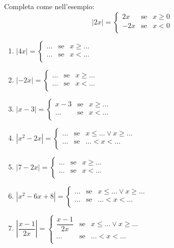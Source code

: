 \begin{esercizio}\label{ese:03.1}
Completa come nell'esempio:
\[
|2x|=
        \left\lbrace 
        \begin{array}{lcl}
        2x & \text{se}& x\geq 0\\
        -2x & \text{se}& x< 0\\
        \end{array}
        \right.
\]

\begin{enumerate}
\item 
\(
|4x|=
\left\lbrace 
\begin{array}{lcl}
\dots & \text{se}& x\geq\dots\\
\dots & \text{se}& x<\dots\\
\end{array}
\right.
\)
\item 
\(
|-2x|=
\left\lbrace 
\begin{array}{lcl}
\dots & \text{se}& x\geq\dots\\
\dots & \text{se}& x<\dots\\
\end{array}
\right.
\)
\item 
\(
|x-3|=
\left\lbrace 
\begin{array}{lcl}
x-3 & \text{se}& x\geq\dots\\
\dots & \text{se}& x<\dots\\
\end{array}
\right.
\)
\item 
\(
|x^2-2x|=
\left\lbrace 
\begin{array}{lcl}
\dots & \text{se}& x\leq\dots \vee x\geq\dots\\
\dots & \text{se}& \dots <x<\dots\\
\end{array}
\right.
\)
\item 
\(
|7-2x|=
\left\lbrace 
\begin{array}{lcl}
\dots & \text{se}& x\geq\dots\\
\dots & \text{se}& x<\dots\\
\end{array}
\right.
\)
\item 
\(
|x^2-6x+8|=
\left\lbrace 
\begin{array}{lcl}
\dots & \text{se}& x\leq\dots \vee x\geq\dots\\
\dots & \text{se}& \dots <x<\dots\\
\end{array}
\right.
\)
\item 
\(
|\dfrac{x-1}{2x}|=
\left\lbrace 
\begin{array}{lcl}
\dfrac{x-1}{2x} & \text{se}& x\leq\dots \vee x\geq\dots\\
\dots & \text{se}& \dots <x<\dots\\
\end{array}
\right.
\)
\end{enumerate}
\end{esercizio}

